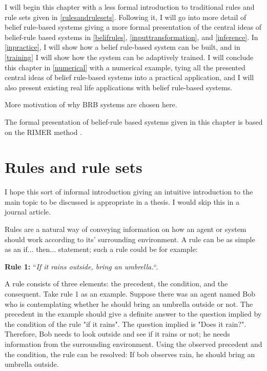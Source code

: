 I will begin this chapter with a less formal introduction to traditional rules and rule sets given in \ref{rulesandrulesets}.
Following it, I will go into more detail of belief rule-based systems giving a more formal presentation of the central ideas of belief-rule based
systems in \ref{belifrules}, \ref{inputtransformation}, and \ref{inference}. In \ref{inpractice}, I will show how a belief rule-based system can be built,
and in \ref{training} I will show how the system can be adaptively trained. I will conclude this chapter in \ref{numerical} with a numerical example, tying all the presented central ideas of belief rule-based systems
into  a practical application, and I will also present existing real life applications with belief rule-based systems.

{\color{red}
More motivation of why BRB systems are chosen here.}

The formal presentation of belief-rule based systems given in this chapter is based on the RIMER
method \cite{rimer2006}.

\section{Rules and rule sets}

{\color{red}I hope this sort of informal introduction giving an intuitive introduction to the main topic to be discussed
is appropriate in a thesis. I would skip this in a journal article.}

\label{rulesandrulesets}
Rules are a natural way of conveying information on how an agent or system should work according to its' surrounding environment.
A rule can be as simple as an if... then... statement; such a rule could be for example:

\begin{displayquote}
\textbf{Rule 1:} ``\textit{If it rains outside, bring an umbrella.}``.
\end{displayquote}

A rule consists of three elements: the precedent, the condition, and the consequent. Take rule 1 as an example.
Suppose there was an agent named Bob who is contemplating whether he should bring an umbrella
outside or not. The precedent in the example should give a definite answer to the question implied by the condition of
the rule "if it rains". The question implied is "Does it rain?".
Therefore, Bob needs to look outside and see if it rains or not; he needs information from the surrounding environment.
Using the observed precedent and the condition, the rule can be resolved: If bob observes rain, he 
should bring an umbrella outside.

